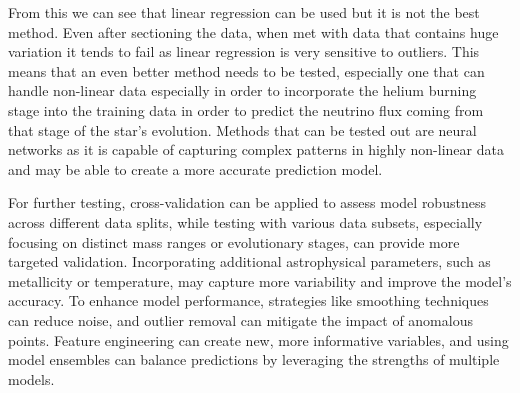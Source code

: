 From this we can see that linear regression can be used but it is not the best method. Even after sectioning the data, when met with data that contains huge variation it tends to fail as linear regression is very sensitive to outliers. This means that an even better method needs to be tested, especially one that can handle non-linear data especially in order to incorporate the helium burning stage into the training data in order to predict the neutrino flux coming from that stage of the star's evolution. Methods that can be tested out are neural networks as it is capable of capturing complex patterns in highly non-linear data and may be able to create a more accurate prediction model.

For further testing, cross-validation can be applied to assess model robustness across different data splits, while testing with various data subsets, especially focusing on distinct mass ranges or evolutionary stages, can provide more targeted validation. Incorporating additional astrophysical parameters, such as metallicity or temperature, may capture more variability and improve the model's accuracy. To enhance model performance, strategies like smoothing techniques can reduce noise, and outlier removal can mitigate the impact of anomalous points. Feature engineering can create new, more informative variables, and using model ensembles can balance predictions by leveraging the strengths of multiple models.
